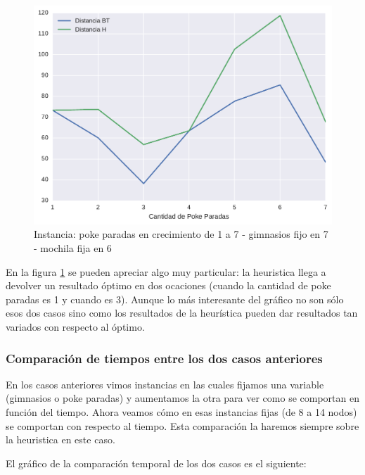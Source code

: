 \begin{figure}[H]
  \begin{center}
    \includegraphics[scale=0.8]{imagenes/ej2test2hvsbttiemposb.pdf}
    \caption{Instancia: poke paradas en crecimiento de 1 a 7 - gimnasios fijo en 7 - mochila fija en 6}
    \label{ej2test2b}
  \end{center}
\end{figure}

En la figura \ref{ej2test2b} se pueden apreciar algo muy particular: la heuristica llega a devolver un resultado óptimo en dos ocaciones (cuando la cantidad de poke paradas es 1 y cuando es 3). Aunque lo más interesante del gráfico no son sólo esos dos casos sino como los resultados de la heurística pueden dar resultados tan variados con respecto al óptimo.

\subsubsection{Comparación de tiempos entre los dos casos anteriores}
En los casos anteriores vimos instancias en las cuales fijamos una variable (gimnasios o poke paradas) y aumentamos la otra para ver como se comportan en función del tiempo. Ahora veamos cómo en esas instancias fijas (de 8 a 14 nodos) se comportan con respecto al tiempo. Esta comparación la haremos siempre sobre la heuristica en este caso.

El gráfico de la comparación temporal de los dos casos es el siguiente:

